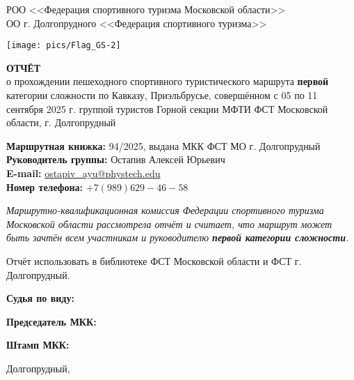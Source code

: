 \begin{titlepage}
\setlength\parindent{0pt}
	\begin{center}
		\large{РОО <<Федерация спортивного туризма Московской области>>\\
		ОО г. Долгопрудного <<Федерация спортивного туризма>>\\}
	\end{center}

	


	
	\begin{center}
		\texttt{[image: pics/Flag\_GS-2]}
		
		\Large{\bfseries{ОТЧЁТ}} \\
		\normalsize о прохождении пешеходного спортивного туристического маршрута \textbf{первой} категории сложности по Кавказу, Приэльбрусье, совершённом с 05 по 11 сентября 2025 г. группой туристов Горной секции МФТИ ФСТ Московской области, г. Долгопрудный
	\end{center}
	\vspace{1.5 cm}
	
	\textbf{Маршрутная книжка:} 94/2025, выдана МКК ФСТ МО г. Долгопрудный \\ 
	\textbf{Руководитель группы:} Остапив Алексей Юрьевич\\
	\textbf{E-mail:} \href{mailto: ostapiv\_ayu@phystech.edu}{ostapiv\_ayu@phystech.edu}\\
	\textbf{Номер телефона:} $+7(989)629-46-58$
	
	\vspace{0.2cm}
	
	\textit{Маршрутно-квалификационная комиссия Федерации спортивного туризма Московской области рассмотрела отчёт и считает, что маршрут может быть зачтён всем участникам и руководителю \textbf{первой категории сложности}.}

	\vspace{0.2cm}
	
	Отчёт использовать в библиотеке ФСТ Московской области и ФСТ г. Долгопрудный.
	
	\vspace{0.8cm}
	\textbf{Судья по виду:} 
	
	
	\vspace{0.8cm}
	\textbf{Председатель МКК:}
	
	\vspace{0.8cm}
	\textbf{Штамп МКК:}
	
	\vfill
	\begin{center}
		Долгопрудный,   \the\year{}
	\end{center}
\end{titlepage}